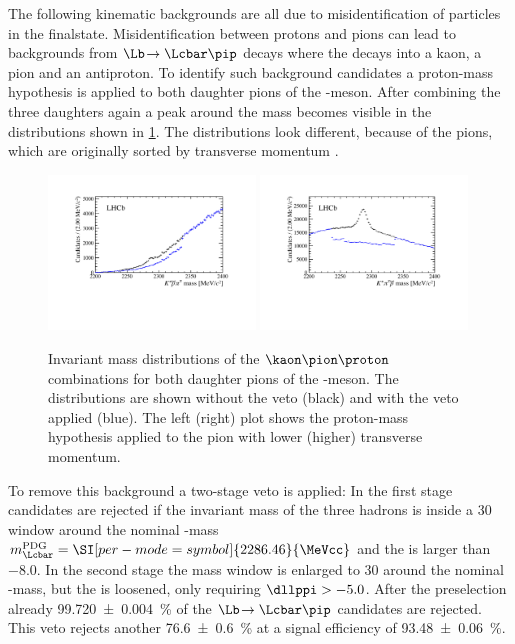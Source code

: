 The following kinematic backgrounds are all due to misidentification of particles in the finalstate.
Misidentification between protons and pions can lead to backgrounds from $\Lb\!\to\Lcbar\pip$ decays where the \Lcbar decays into a kaon, a pion and an antiproton.
To identify such background candidates a proton-mass hypothesis is applied to both daughter pions of the \Dm-meson.
After combining the three \D daughters again a peak around the \Lc mass becomes visible in the distributions shown in \cref{fig:LcVeto}.
The distributions look different, because of the pions, which are originally sorted by transverse momentum \pt.
\begin{figure}[tbp]
    \centering
    \includegraphics[width=0.49\textwidth]{06selection/figs/LcHypo1.pdf}
    \includegraphics[width=0.49\textwidth]{06selection/figs/LcHypo2.pdf}
    \caption{Invariant mass distributions of the $\kaon\pion\proton$ combinations for both daughter pions of the \Dm-meson.
    The distributions are shown without the veto (black) and with the veto applied (blue).
    The left (right) plot shows the proton-mass hypothesis applied to the pion with lower (higher) transverse momentum.}
    \label{fig:LcVeto}
\end{figure}
To remove this background a two-stage veto is applied: In the first stage candidates are rejected if the invariant mass of the three hadrons is inside a \SI[per-mode=symbol]{30}{\MeVcc}  window around the nominal \mbox{\Lcbar-mass} $m_\Lcbar^{\text{PDG}}=\SI[per-mode=symbol]{2286.46}{\MeVcc}$ and the \dllppi is larger than \num{-8.0}.
In the second stage the mass window is enlarged to \SI[per-mode=symbol]{30}{\MeVcc} around the nominal \Lcbar-mass, but the \dllppi is loosened, only requiring $\dllppi>-5.0$.
After the preselection already \SI{99.720\pm0.004}{\percent} of the $\Lb\!\to\Lcbar\pip$ candidates are rejected.
This veto rejects another \SI{76.6\pm0.6}{\percent} at a signal efficiency of \SI{93.48\pm0.06}{\percent}.

